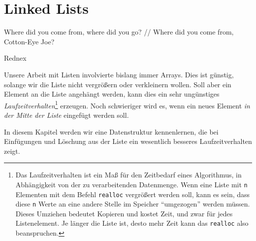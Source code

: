 \chapter{Linked Lists} \label{chp:linkedlist}
\epigraph{Where did you come from, where did you go? // Where did you come from, Cotton-Eye Joe?}
{Rednex}

Unsere Arbeit mit Listen involvierte bislang immer Arrays. Dies ist günstig, solange wir die Liste nicht vergrößern oder verkleinern wollen. Soll aber ein Element an die Liste angehängt werden, kann dies ein sehr ungünstiges \emph{Laufzeitverhalten}\footnote{Das Laufzeitverhalten ist ein Maß für den Zeitbedarf eines Algorithmus, in Abhängigkeit von der zu verarbeitenden Datenmenge. Wenn eine Liste mit \texttt{n} Elementen mit dem Befehl \texttt{realloc} vergrößert werden soll, kann es sein, dass diese \texttt{n} Werte an eine andere Stelle im Speicher \enquote{umgezogen} werden müssen. Dieses Umziehen bedeutet Kopieren und kostet Zeit, und zwar für jedes Listenelement. Je länger die Liste ist, desto mehr Zeit kann das \texttt{realloc} also beanspruchen.} erzeugen. Noch schwieriger wird es, wenn ein neues Element \emph{in der Mitte der Liste} eingefügt werden soll.

In diesem Kapitel werden wir eine Datenstruktur kennenlernen, die bei Einfügungen und Löschung aus der Liste ein wesentlich besseres Laufzeitverhalten zeigt.

